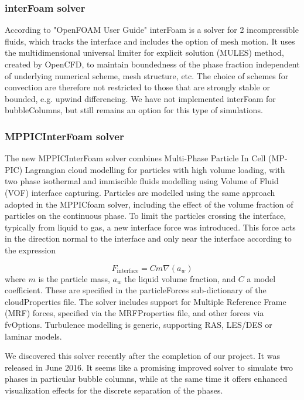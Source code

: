 \documentclass[11pt, a4paper, twoside]{article}
\begin{document}
\subsubsection{interFoam solver}
According to "OpenFOAM User Guide" interFoam is a solver for 2 incompressible fluids, which tracks the interface and includes the option of mesh motion. It uses the multidimensional universal limiter for explicit solution (MULES) method, created by OpenCFD, to maintain boundedness of the phase fraction independent of underlying numerical scheme, mesh structure, etc. The choice of schemes for convection are therefore not restricted to those that are strongly stable or bounded, e.g. upwind differencing. We have not implemented interFoam for bubbleColumns, but still remains an option for this type of simulations.

\subsubsection{MPPICInterFoam solver}
The new MPPICInterFoam solver combines Multi-Phase Particle In Cell (MP-PIC) Lagrangian cloud modelling for particles with high volume loading, with two phase isothermal and immiscible fluids modelling using Volume of Fluid (VOF) interface capturing. Particles are modelled using the same approach adopted in the MPPICfoam solver, including the effect of the volume fraction of particles on the continuous phase. To limit the particles crossing the interface, typically from liquid to gas, a new interface force was introduced. This force acts in the direction normal to the interface and only near the interface according to the expression 

\begin{equation}
F_\mathrm{interface} = Cm\nabla(a_w)
\end{equation}
where ${m}$ is the particle mass, ${a_w}$ the liquid volume fraction, and ${C}$ a model coefficient. These are specified in the particleForces sub-dictionary of the cloudProperties file. The solver includes support for Multiple Reference Frame (MRF) forces, specified via the MRFProperties file, and other forces via fvOptions. Turbulence modelling is generic, supporting RAS, LES/DES or laminar models. 

We discovered this solver recently after the completion of our project. It was released in June 2016. It seems like a promising improved solver to simulate two phases in particular bubble columns, while at the same time it offers enhanced visualization effects for the discrete separation of the phases.
\end{document}
